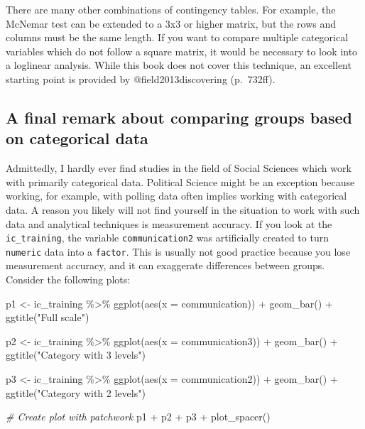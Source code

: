\documentclass[
]{book}
\newenvironment{Shaded}{\begin{snugshade}}{\end{snugshade}}
\newcommand{\AttributeTok}[1]{\textcolor[rgb]{0.77,0.63,0.00}{#1}}
\newcommand{\CommentTok}[1]{\textcolor[rgb]{0.56,0.35,0.01}{\textit{#1}}}
\newcommand{\FunctionTok}[1]{\textcolor[rgb]{0.00,0.00,0.00}{#1}}
\newcommand{\NormalTok}[1]{#1}
\newcommand{\OtherTok}[1]{\textcolor[rgb]{0.56,0.35,0.01}{#1}}
\newcommand{\SpecialCharTok}[1]{\textcolor[rgb]{0.00,0.00,0.00}{#1}}
\newcommand{\StringTok}[1]{\textcolor[rgb]{0.31,0.60,0.02}{#1}}
\begin{document}
There are many other combinations of contingency tables. For example, the McNemar test can be extended to a 3x3 or higher matrix, but the rows and columns must be the same length. If you want to compare multiple categorical variables which do not follow a square matrix, it would be necessary to look into a loglinear analysis. While this book does not cover this technique, an excellent starting point is provided by @field2013discovering (p.~732ff).

\hypertarget{a-final-remark-about-comparing-groups-based-on-categorical-data}{%
\subsection{A final remark about comparing groups based on categorical data}\label{a-final-remark-about-comparing-groups-based-on-categorical-data}}

Admittedly, I hardly ever find studies in the field of Social Sciences which work with primarily categorical data. Political Science might be an exception because working, for example, with polling data often implies working with categorical data. A reason you likely will not find yourself in the situation to work with such data and analytical techniques is measurement accuracy. If you look at the \texttt{ic\_training}, the variable \texttt{communication2} was artificially created to turn \texttt{numeric} data into a \texttt{factor}. This is usually not good practice because you lose measurement accuracy, and it can exaggerate differences between groups. Consider the following plots:

\begin{Shaded}
\begin{Highlighting}[]
\NormalTok{p1 }\OtherTok{\textless{}{-}}\NormalTok{ ic\_training }\SpecialCharTok{\%\textgreater{}\%}
  \FunctionTok{ggplot}\NormalTok{(}\FunctionTok{aes}\NormalTok{(}\AttributeTok{x =}\NormalTok{ communication)) }\SpecialCharTok{+}
  \FunctionTok{geom\_bar}\NormalTok{() }\SpecialCharTok{+}
  \FunctionTok{ggtitle}\NormalTok{(}\StringTok{"Full scale"}\NormalTok{)}

\NormalTok{p2 }\OtherTok{\textless{}{-}}\NormalTok{ ic\_training }\SpecialCharTok{\%\textgreater{}\%}
  \FunctionTok{ggplot}\NormalTok{(}\FunctionTok{aes}\NormalTok{(}\AttributeTok{x =}\NormalTok{ communication3)) }\SpecialCharTok{+}
  \FunctionTok{geom\_bar}\NormalTok{() }\SpecialCharTok{+}
  \FunctionTok{ggtitle}\NormalTok{(}\StringTok{"Category with 3 levels"}\NormalTok{)}

\NormalTok{p3 }\OtherTok{\textless{}{-}}\NormalTok{ ic\_training }\SpecialCharTok{\%\textgreater{}\%}
  \FunctionTok{ggplot}\NormalTok{(}\FunctionTok{aes}\NormalTok{(}\AttributeTok{x =}\NormalTok{ communication2)) }\SpecialCharTok{+}
  \FunctionTok{geom\_bar}\NormalTok{() }\SpecialCharTok{+}
  \FunctionTok{ggtitle}\NormalTok{(}\StringTok{"Category with 2 levels"}\NormalTok{)}

\CommentTok{\# Create plot with \textquotesingle{}patchwork\textquotesingle{}}
\NormalTok{p1 }\SpecialCharTok{+}\NormalTok{ p2 }\SpecialCharTok{+}\NormalTok{ p3 }\SpecialCharTok{+} \FunctionTok{plot\_spacer}\NormalTok{()}
\end{Highlighting}
\end{Shaded}
\end{document}
